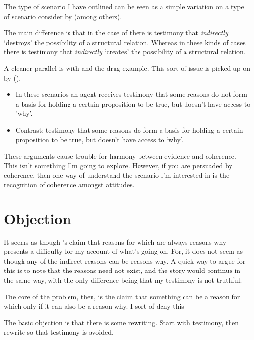 \documentclass[10pt]{article}
\begin{document}
The type of scenario I have outlined can be seen as a simple variation on a type of scenario consider by \textcite{Worsnip:2018aa} (among others).

The main difference is that in the case of \citeauthor{Worsnip:2018aa} there is testimony that \emph{indirectly} `destroys' the possibility of a structural relation.
Whereas in these kinds of cases there is testimony that \emph{indirectly} `creates' the possibility of a structural relation.

A cleaner parallel is with \cite{Christensen:2007aa} and the drug example.
This sort of issue is picked up on by \citeauthor{Neta:2019aa} (\citeyear[189]{Neta:2019aa}).

\begin{itemize}
\item In these scenarios an agent receives testimony that some reasons do not form a basis for holding a certain proposition to be true, but doesn't have access to `why'.
\item Contrast: testimony that some reasons do form a basis for holding a certain proposition to be true, but doesn't have access to `why'.
\end{itemize}

These arguments cause trouble for harmony between evidence and coherence.
This isn't something I'm going to explore.
However, if you are persuaded by coherence, then one way of understand the scenario I'm interested in is the recognition of coherence amongst attitudes.


\section{Objection}
\label{sec:objection}

It seems as though \citeauthor{Neta:2019aa}'s claim that reasons for which are always reasons why presents a difficulty for my account of what's going on.
For, it does not seem as though any of the indirect reasons can be reasons why.
A quick way to argue for this is to note that the reasons need not exist, and the story would continue in the same way, with the only difference being that my testimony is not truthful.

The core of the problem, then, is the claim that something can be a reason for which only if it can also be a reason why.
I sort of deny this.

The basic objection is that there is some rewriting.
Start with testimony, then rewrite so that testimony is avoided.
\end{document}
